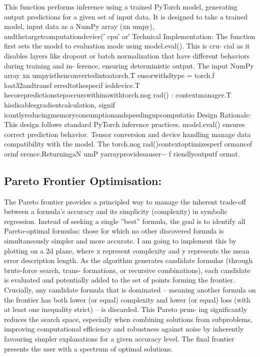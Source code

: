 \documentclass{article}
\begin{document}
This function performs inference using a trained PyTorch model, generating output predictions for a given set of
input data. It is designed to take a trained model, input data as a NumPy array (xn umpy), andthetargetcomputationdevice(′ cpu′ or′
Technical Implementation: The function first sets the model to evaluation mode using model.eval(). This is cru-
cial as it disables layers like dropout or batch normalization that have different behaviors during training and in-
ference, ensuring deterministic output. The input NumPy array xn umpyisthenconvertedintoatorch.T ensorwithdtype =
torch.f loat32andtransf erredtothespecif ieddevice.T hecorepredictionstepoccurswithinawithtorch.nog rad() :
contextmanager.T hisdisablesgradientcalculation, signif icantlyreducingmemoryconsumptionandspeedingupcomputatio
Design Rationale: This design follows standard PyTorch inference practices. model.eval() ensures correct
prediction behavior. Tensor conversion and device handling manage data compatibility with the model. The torch.nog rad()contextoptimizesperf ormancef orinf erence.ReturningaN umP yarrayprovidesauser−
f riendlyoutputf ormat.\\ 


\subsection{Pareto Frontier Optimisation: }

The Pareto frontier provides a principled way to manage the inherent trade-off between a formula’s accuracy
and its simplicity (complexity) in symbolic regression. Instead of seeking a single ”best” formula, the goal is
to identify all Pareto-optimal formulas: those for which no other discovered formula is simultaneously simpler
and more accurate.
I am going to implement this by plotting on a 2d plane, where x represent complexity and y represents the mean
error description length. As the algorithm generates candidate formulas (through brute-force search, trans-
formations, or recursive combinations), each candidate is evaluated and potentially added to the set of points
forming the frontier.
Crucially, any candidate formula that is dominated – meaning another formula on the frontier has both lower (or
equal) complexity and lower (or equal) loss (with at least one inequality strict) – is discarded. This Pareto prun-
ing significantly reduces the search space, especially when combining solutions from subproblems, improving
computational efficiency and robustness against noise by inherently favouring simpler explanations for a given
accuracy level. The final frontier presents the user with a spectrum of optimal solutions.\\
\end{document}
